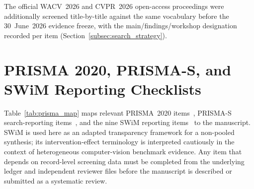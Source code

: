 \documentclass[10pt,a4paper]{article}
\begin{document}
\noindent The official WACV~2026 and CVPR~2026 open-access proceedings were additionally screened title-by-title against the same vocabulary before the 30~June~2026 evidence freeze, with the main/findings/workshop designation recorded per item (Section~\ref{subsec:search_strategy}).

\section{PRISMA 2020, PRISMA-S, and SWiM Reporting Checklists}
\label{app:prisma2020}
Table~\ref{tab:prisma_map} maps relevant PRISMA~2020 items~\citep{page2021prisma}, PRISMA-S search-reporting items~\citep{rethlefsen2021prismas}, and the nine SWiM reporting items~\citep{campbell2020swim} to the manuscript. SWiM is used here as an adapted transparency framework for a non-pooled synthesis; its intervention-effect terminology is interpreted cautiously in the context of heterogeneous computer-vision benchmark evidence. Any item that depends on record-level screening data must be completed from the underlying ledger and independent reviewer files before the manuscript is described or submitted as a systematic review.
\end{document}
